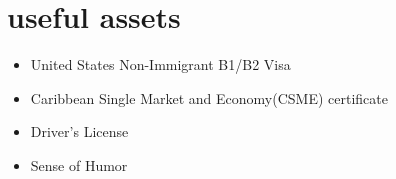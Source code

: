 \documentclass[]{friggeri-cv} %
\begin{document}

\section{useful assets}
\begin{itemize}
	\item United States Non-Immigrant B1/B2 Visa
    \item Caribbean Single Market and Economy(CSME) certificate
    \item Driver's License
    \item Sense of Humor
\end{itemize}









\end{document}
